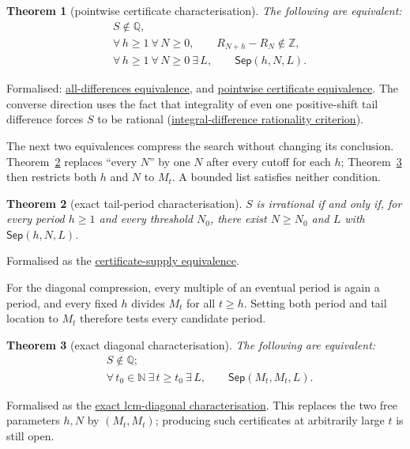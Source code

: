 \documentclass[11pt]{article}
\newcommand{\commit}{ebc98ee71f6819bd9fe344a0bb343542c604e533}
\newcommand{\repobase}{https://github.com/wcook04/plectis-lean-erdos249-257/blob/\commit}
\newcommand{\PK}{Erdos249257}
\newcommand{\lword}[4]{\href{\repobase/\PK/#1\#L#2}{#4}}
\newtheorem{theorem}{Theorem}[section]
\theoremstyle{definition}
\theoremstyle{remark}
\newcommand{\N}{\mathbb{N}}
\newcommand{\Z}{\mathbb{Z}}
\newcommand{\Q}{\mathbb{Q}}
\begin{document}
\begin{theorem}[pointwise certificate characterisation]
\label{res:pointwisecomplete}
The following are equivalent:
\[
\begin{aligned}
 &S\notin\Q,\\
 &\forall\,h\ge1\ \forall\,N\ge0,\qquad R_{N+h}-R_N\notin\Z,\\
 &\forall\,h\ge1\ \forall\,N\ge0\ \exists\,L,\qquad
      \mathsf{Sep}(h,N,L).
\end{aligned}
\]
\end{theorem}
\noindent Formalised:
\lword{LcmConeFlatness.lean}{386}{irrational_totient_series_iff_all_tail_diffs_nonintegral}{all-differences equivalence},
and
\lword{LcmConeFlatness.lean}{399}{irrational_totient_series_iff_pointwise_certificates}{pointwise certificate equivalence}.
The converse direction uses the fact that integrality of even one
positive-shift tail difference forces $S$ to be rational
(\lword{LcmConeFlatness.lean}{357}{not_irrational_of_tail_diff_mem_int}{integral-difference rationality criterion}).

The next two equivalences compress the search without changing its conclusion.
Theorem~\ref{res:red21} replaces ``every \(N\)'' by one \(N\) after every
cutoff for each \(h\); Theorem~\ref{res:diag} then restricts both \(h\) and
\(N\) to \(M_t\).  A bounded list satisfies neither condition.

\begin{theorem}[exact tail-period characterisation]\label{res:red21}
$S$ is irrational if and only if, for every period $h\ge1$ and every threshold
$N_0$, there exist $N\ge N_0$ and $L$ with $\mathsf{Sep}(h,N,L)$.
\end{theorem}
\noindent Formalised as the
\lword{LcmConeFlatness.lean}{412}{irrational_totient_series_iff_certificate_supply}{certificate-supply equivalence}.

For the diagonal compression, every multiple of an eventual period is again
a period, and every fixed \(h\) divides \(M_t\) for all \(t\geq h\).  Setting
both period and tail location to \(M_t\) therefore tests every candidate period.

\begin{theorem}[exact diagonal characterisation]\label{res:diag}
The following are equivalent:
\[
\begin{aligned}
 &S\notin\Q;\\
 &\forall\,t_0\in\N\ \exists\,t\geq t_0\ \exists\,L,\qquad
   \mathsf{Sep}(M_t,M_t,L).
\end{aligned}
\]
\end{theorem}
\noindent Formalised as the
\lword{LcmConeFlatness.lean}{426}{irrational_totient_series_iff_lcm_diagonal_certificate_supply}{exact lcm-diagonal characterisation}.
This replaces the two free parameters \(h,N\) by \((M_t,M_t)\);
producing such certificates at arbitrarily large \(t\) is still open.
\end{document}
